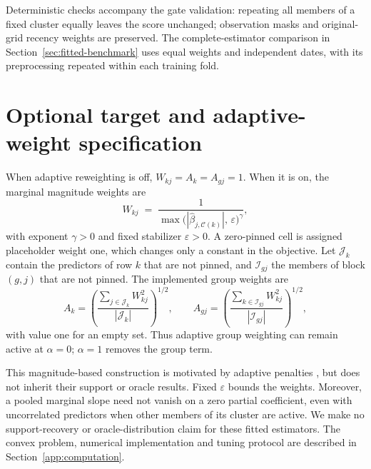 \documentclass[11pt,a4paper]{article}
\begin{document}
Deterministic checks accompany the gate validation: repeating all members of a
fixed cluster equally leaves the score unchanged; observation masks and original-grid recency weights
are preserved. The complete-estimator comparison in
Section~\ref{sec:fitted-benchmark} uses equal weights and
independent dates, with its preprocessing repeated within each training fold.


\FloatBarrier

\section{Optional target and adaptive-weight specification}\label{app:adaptive}
When adaptive reweighting is off, $W_{kj}=A_k=A_{gj}=1$. When it is on,
the marginal magnitude weights are
%
\begin{equation} \label{eq:adapt-cell}
	W_{kj} \;=\; \frac{1}
	{\max\bigl(|\hat{\beta}_{j, \mathcal{C}(k)}|,\, \varepsilon\bigr)^{\gamma}},
\end{equation}
%
with exponent $\gamma>0$ and fixed stabilizer $\varepsilon>0$. A zero-pinned
cell is assigned placeholder weight one, which changes only a constant in the
objective. Let $\mathcal J_k$ contain the predictors of row $k$ that are not
pinned, and $\mathcal I_{gj}$ the members of block $(g,j)$ that are not pinned.
The implemented group weights are
\begin{equation}\label{eq:adapt-group}
	A_k=\left(\frac{\sum_{j\in\mathcal J_k}W_{kj}^2}
	{|\mathcal J_k|}\right)^{1/2},\qquad
	A_{gj}=\left(\frac{\sum_{k\in\mathcal I_{gj}}W_{kj}^2}
	{|\mathcal I_{gj}|}\right)^{1/2},
\end{equation}
with value one for an empty set. Thus adaptive group weighting can remain active
at $\alpha=0$; $\alpha=1$ removes the group term.

This magnitude-based construction is motivated by adaptive penalties
\citep{Zou:2006,Wang+Leng:2008}, but does not inherit their support or oracle
results. Fixed $\varepsilon$ bounds the weights. Moreover, a pooled marginal
slope need not vanish on a zero partial coefficient, even with uncorrelated
predictors when other members of its cluster are active. We make no
support-recovery or oracle-distribution claim for these fitted estimators.
The convex problem, numerical implementation and tuning protocol are described
in Section~\ref{app:computation}.


\FloatBarrier
\end{document}

